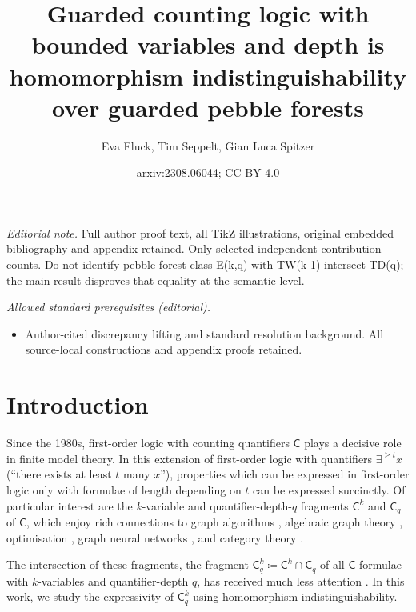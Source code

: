 \documentclass[10pt,a4paper]{article}
\title{Guarded counting logic with bounded variables and depth is homomorphism indistinguishability over guarded pebble forests}
\author{Eva Fluck, Tim Seppelt, Gian Luca Spitzer}
\date{arxiv:2308.06044; CC BY 4.0}
\begin{document}
\maketitle
\noindent\textit{Editorial note.} Full author proof text, all TikZ illustrations, original embedded bibliography and appendix retained. Only selected independent contribution counts. Do not identify pebble-forest class E(k,q) with TW(k-1) intersect TD(q); the main result disproves that equality at the semantic level.\par\medskip
\noindent\textit{Allowed standard prerequisites (editorial).}\begin{itemize}
\item Author-cited discrepancy lifting and standard resolution background. All source-local constructions and appendix proofs retained.
\end{itemize}\medskip
\section{Introduction}

Since the 1980s, first-order logic with counting quantifiers $\mathsf{C}$ plays a decisive role in finite model theory.
In this extension of first-order logic with quantifiers $\exists^{\geq t} x$ (``there exists at least $t$ many $x$''), properties which can be expressed in first-order logic only with formulae of length depending on $t$ can be expressed succinctly.
Of particular interest are the $k$-variable and quantifier-depth-$q$ fragments $\mathsf{C}^k$ and $\mathsf{C}_q$ of $\mathsf{C}$, which
enjoy rich connections to graph algorithms \cite{dvorak_recognizing_2010}, algebraic graph theory \cite{dell_lovasz_2018,grohe_homomorphism_2022}, optimisation \cite{grohe_homomorphism_2022,roberson_lasserre_2023}, graph neural networks \cite{grohe_logic_2021}, and category theory \cite{dawar_lovasz-type_2021,abramsky_pebbling_2017}.

The intersection of these fragments, the fragment $\mathsf{C}^k_q \coloneqq \mathsf{C}^k \cap \mathsf{C}_q$ of all $\mathsf{C}$-formulae with $k$-variables and quantifier-depth $q$, has received much less attention \cite{rattan_weisfeiler-leman_2023}. In this work, we study the expressivity of $\mathsf{C}^k_q$ using homomorphism indistinguishability.
\end{document}
